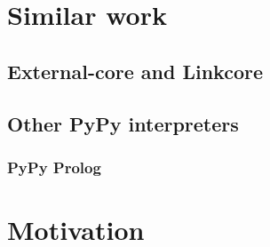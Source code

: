 \section{Similar work}


\subsection{External-core and Linkcore}



\subsection{Other PyPy interpreters}

\subsubsection{PyPy Prolog}


\section{Motivation}




